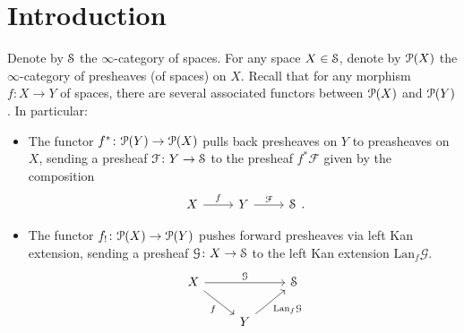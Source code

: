 \documentclass[main.tex]{subfiles}
\begin{document}
\section*{Introduction}
\label{sec:introduction}

Denote by $\S$ the $\infty$-category of spaces. For any space $X \in \S$, denote by $\P(X)$ the $\infty$-category of presheaves (of spaces) on $X$. Recall that for any morphism $f\colon X \to Y$ of spaces, there are several associated functors between $\P(X)$ and $\P(Y)$. In particular:
\begin{itemize}
  \item The functor $f^{*}\colon \P(Y) \to \P(X)$ pulls back presheaves on $Y$ to preasheaves on $X$, sending a presheaf $\mathcal{F}\colon Y \to \S$ to the presheaf $f^{*}\mathcal{F}$ given by the composition
    \begin{equation*}
      \begin{tikzcd}
        X
        \arrow[r, "f"]
        & Y
        \arrow[r, "\mathcal{F}"]
        & \S
      \end{tikzcd}.
    \end{equation*}

  \item The functor $f_{!}\colon \P(X) \to \P(Y)$ pushes forward presheaves via left Kan extension, sending a presheaf $\mathcal{G}\colon X \to \S$ to the left Kan extension $\mathrm{Lan}_{f}\mathcal{G}$.
    \begin{equation*}
      \begin{tikzcd}
        X
        \arrow[rr, "\mathcal{G}"]
        \arrow[dr, swap, "f"]
        && \S
        \\
        & Y
        \arrow[ur, swap, "\mathrm{Lan}_{f}\mathcal{G}"]
      \end{tikzcd}
    \end{equation*}
\end{itemize}
\end{document}
